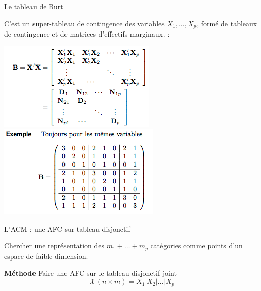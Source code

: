 \documentclass[12pt]{beamer}
\begin{document}

\begin{frame}{Le tableau de Burt}

 C'est un super-tableau de contingence des variables
$X_1, . . . , X_p$, formé de tableaux de contingence et de
matrices d'effectifs marginaux. :

\centering
\includegraphics[scale=0.5]{Disj4} 
\includegraphics[scale=0.5]{Disj5} 

\end{frame}


\begin{frame}{L'ACM : une AFC sur tableau disjonctif}

Chercher une représentation des $m_1+\ldots+m_p$
catégories comme points d'un espace de faible dimension.

\textbf{Méthode }  Faire une AFC sur le tableau disjonctif joint   
$$ \mathcal{X}(n \times m)= {X}_1\vert  {X}_2\vert  \ldots  \vert{X}_p $$

 

 

\end{frame}

\end{document}
